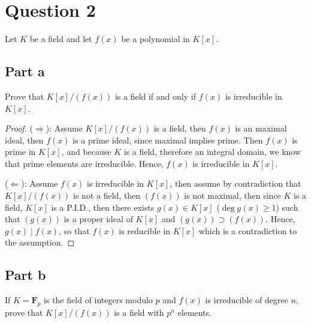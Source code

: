 \section{Question 2}

\begin{question}
    Let $K$ be a field and let $f(x)$ be a polynomial in $K[x]$.
\end{question}

\subsection{Part a}

\begin{question}
    Prove that $K[x] /(f(x))$ is a field if and only if $f(x)$ is irreducible in $K[x]$.
\end{question}

\begin{answer}
    \begin{proof}
        ($\Rightarrow$): Assume $K[x]/(f(x))$ is a field, then $f(x)$ is an maximal ideal, then $f(x)$ is a prime ideal, since maximal implies prime. Then $f(x)$ is prime in $K[x]$, and because $K$ is a field, therefore an integral domain, we know that prime elements are irreducible. Hence, $f(x)$ is irreducible in $K[x]$.
        
        ($\Leftarrow$): Assume $f(x)$ is irreducible in $K[x]$, then assume by contradiction that $K[x]/(f(x))$ is not a field, then $(f(x))$ is not maximal, then since $K$ is a field, $K[x]$ is a P.I.D., then there exists $g(x) \in K[x]$ ($\deg g(x) \geq 1$) such that $(g(x))$ is a proper ideal of $K[x]$ and $(g(x)) \supset (f(x))$. Hence, $g(x)\mid f(x)$, so that $f(x)$ is reducible in $K[x]$ which is a contradiction to the assumption.
    \end{proof}
\end{answer}

\subsection{Part b}

\begin{question}
    If $K=\mathbf{F}_p$ is the field of integers modulo $p$ and $f(x)$ is irreducible of degree $n$, prove that $K[x] /(f(x))$ is a field with $p^n$ elements.
\end{question}

